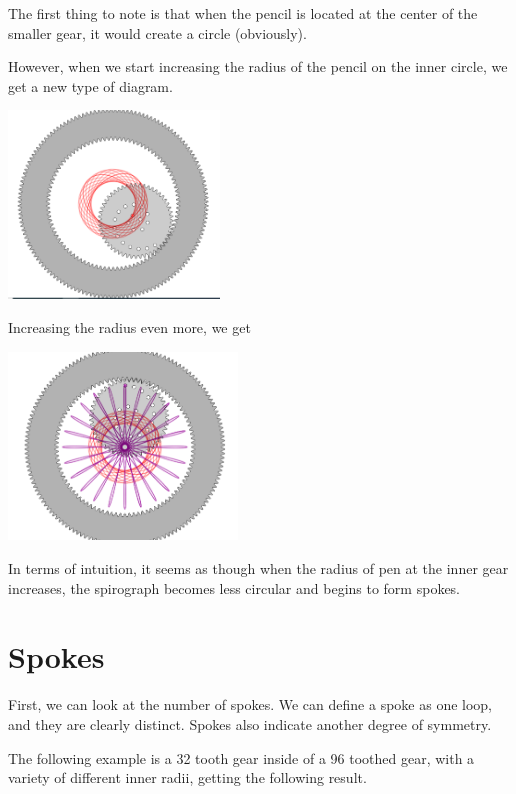 \documentclass{article}
\theoremstyle{remark}
\theoremstyle{problem}
\numberwithin{problem}{subsection}
\numberwithin{Problem}{section}
\theoremstyle{definition}
\theoremstyle{definition}
\begin{document}
The first thing to note is that when the pencil is located at the center of the smaller gear, it would create a circle (obviously).

However, when we start increasing the radius of the pencil on the inner circle, we get a new type of diagram. 

\begin{center}
\includegraphics[height=5cm]{images/IncreaseRad1.png}
\end{center}

Increasing the radius even more, we get 

\begin{center}
\includegraphics[height=5cm]{images/MaxRad2.png}
\end{center}

In terms of intuition, it seems as though when the radius of pen at the inner gear increases, the spirograph becomes less circular and begins to form spokes.

\section{Spokes}

First, we can look at the number of spokes. We can define a spoke as one loop, and they are clearly distinct. Spokes also indicate another degree of symmetry.

The following example is a 32 tooth gear inside of a 96 toothed gear, with a variety of different inner radii, getting the following result. 
\end{document}
